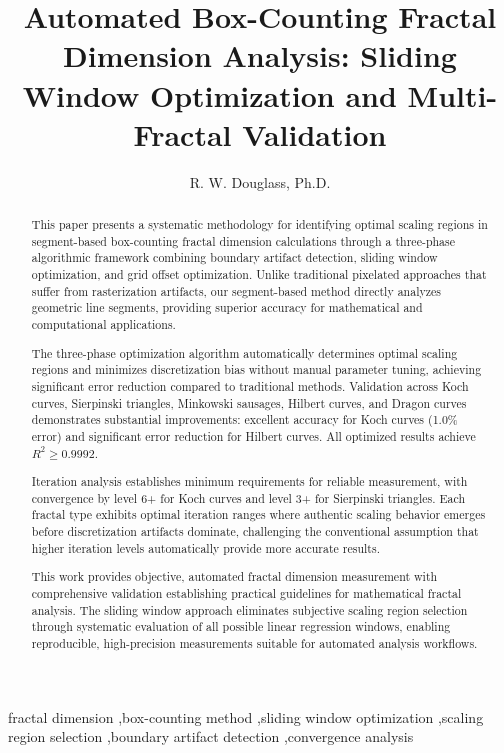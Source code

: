\documentclass[preprint,12pt]{elsarticle}
\begin{document}
\begin{frontmatter}

\title{Automated Box-Counting Fractal Dimension Analysis: Sliding Window Optimization and Multi-Fractal Validation}

\author{R. W. Douglass, Ph.D.}



\begin{abstract}
This paper presents a systematic methodology for identifying optimal scaling regions in segment-based box-counting fractal dimension calculations through a three-phase algorithmic framework combining boundary artifact detection, sliding window optimization, and grid offset optimization. Unlike traditional pixelated approaches that suffer from rasterization artifacts, our segment-based method directly analyzes geometric line segments, providing superior accuracy for mathematical and computational applications.

The three-phase optimization algorithm automatically determines optimal scaling regions and minimizes discretization bias without manual parameter tuning, achieving significant error reduction compared to traditional methods. Validation across Koch curves, Sierpinski triangles, Minkowski sausages, Hilbert curves, and Dragon curves demonstrates substantial improvements: excellent accuracy for Koch curves (1.0\% error) and significant error reduction for Hilbert curves. All optimized results achieve $R^2 \geq 0.9992$.

Iteration analysis establishes minimum requirements for reliable measurement, with convergence by level 6+ for Koch curves and level 3+ for Sierpinski triangles. Each fractal type exhibits optimal iteration ranges where authentic scaling behavior emerges before discretization artifacts dominate, challenging the conventional assumption that higher iteration levels automatically provide more accurate results.

This work provides objective, automated fractal dimension measurement with comprehensive validation establishing practical guidelines for mathematical fractal analysis. The sliding window approach eliminates subjective scaling region selection through systematic evaluation of all possible linear regression windows, enabling reproducible, high-precision measurements suitable for automated analysis workflows.
\end{abstract}

\begin{keyword}
fractal dimension \sep box-counting method \sep sliding window optimization \sep scaling region selection \sep boundary artifact detection \sep convergence analysis
\end{keyword}

\end{frontmatter}
\end{document}

